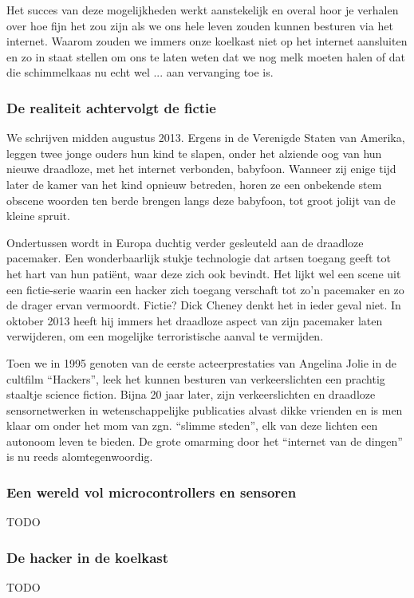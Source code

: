 \documentclass[DIV=calc,paper=a4,fontsize=11pt,twocolumn,draft]{scrartcl}
\begin{document}
Het succes van deze mogelijkheden werkt aanstekelijk en overal hoor je verhalen
over hoe fijn het zou zijn als we ons hele leven zouden kunnen besturen via het
internet. Waarom zouden we immers onze koelkast niet op het internet aansluiten
en zo in staat stellen om ons te laten weten dat we nog melk moeten halen of
dat die schimmelkaas nu echt wel ... aan vervanging toe is.

\subsubsection*{De realiteit achtervolgt de fictie}
\vspace{-3mm}

We schrijven midden augustus 2013. Ergens in de Verenigde Staten van Amerika,
leggen twee jonge ouders hun kind te slapen, onder het alziende oog van hun
nieuwe draadloze, met het internet verbonden, babyfoon. Wanneer zij enige tijd
later de kamer van het kind opnieuw betreden, horen ze een onbekende stem
obscene woorden ten berde brengen langs deze babyfoon, tot groot jolijt van de
kleine spruit.

Ondertussen wordt in Europa duchtig verder gesleuteld aan de draadloze
pacemaker. Een wonderbaarlijk stukje technologie dat artsen toegang geeft tot
het hart van hun pati\"ent, waar deze zich ook bevindt. Het lijkt wel een scene
uit een fictie-serie waarin een hacker zich toegang verschaft tot zo'n
pacemaker en zo de drager ervan vermoordt. Fictie? Dick Cheney denkt het in
ieder geval niet. In oktober 2013 heeft hij immers het draadloze aspect van
zijn pacemaker laten verwijderen, om een mogelijke terroristische aanval te
vermijden.

Toen we in 1995 genoten van de eerste acteerprestaties van Angelina Jolie in de
cultfilm ``Hackers'', leek het kunnen besturen van verkeerslichten een prachtig
staaltje science fiction. Bijna 20 jaar later, zijn verkeerslichten en
draadloze sensornetwerken in wetenschappelijke publicaties alvast dikke
vrienden en is men klaar om onder het mom van zgn. ``slimme steden'', elk van
deze lichten een autonoom leven te bieden. De grote omarming door het
``internet van de dingen'' is nu reeds alomtegenwoordig.

\subsubsection*{Een wereld vol microcontrollers en sensoren}
\vspace{-3mm}

TODO

\subsubsection*{De hacker in de koelkast}
\vspace{-3mm}

TODO


\lipsum[1-10]
\end{document}
